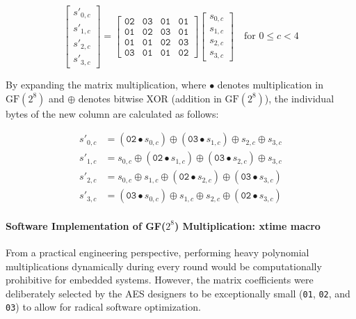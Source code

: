 \documentclass[11pt,a4paper]{report}
\begin{document}
\begin{equation}
\begin{bmatrix}
    s'_{0,c} \\
    s'_{1,c} \\
    s'_{2,c} \\
    s'_{3,c}
\end{bmatrix}
=
\begin{bmatrix}
    \texttt{02} & \texttt{03} & \texttt{01} & \texttt{01} \\
    \texttt{01} & \texttt{02} & \texttt{03} & \texttt{01} \\
    \texttt{01} & \texttt{01} & \texttt{02} & \texttt{03} \\
    \texttt{03} & \texttt{01} & \texttt{01} & \texttt{02}
\end{bmatrix}
\begin{bmatrix}
    s_{0,c} \\
    s_{1,c} \\
    s_{2,c} \\
    s_{3,c}
\end{bmatrix}
\quad \text{for } 0 \le c < 4
\label{eq:mix_columns_matrix}
\end{equation}

By expanding the matrix multiplication, where $\bullet$ denotes multiplication in $\mathrm{GF}(2^8)$ and $\oplus$ denotes bitwise XOR (addition in $\mathrm{GF}(2^8)$), the individual bytes of the new column are calculated as follows:

\begin{equation}
\begin{aligned}
    s'_{0,c} &= (\texttt{02} \bullet s_{0,c}) \oplus (\texttt{03} \bullet s_{1,c}) \oplus s_{2,c} \oplus s_{3,c} \\
    s'_{1,c} &= s_{0,c} \oplus (\texttt{02} \bullet s_{1,c}) \oplus (\texttt{03} \bullet s_{2,c}) \oplus s_{3,c} \\
    s'_{2,c} &= s_{0,c} \oplus s_{1,c} \oplus (\texttt{02} \bullet s_{2,c}) \oplus (\texttt{03} \bullet s_{3,c}) \\
    s'_{3,c} &= (\texttt{03} \bullet s_{0,c}) \oplus s_{1,c} \oplus s_{2,c} \oplus (\texttt{02} \bullet s_{3,c})
\end{aligned}
\label{eq:mix_columns_bytes}
\end{equation}

\paragraph{Software Implementation of GF($2^8$) Multiplication: xtime macro}
From a practical engineering perspective, performing heavy polynomial multiplications dynamically during every round would be computationally prohibitive for embedded systems. 
However, the matrix coefficients were deliberately selected by the AES designers to be exceptionally small (\texttt{01}, \texttt{02}, and \texttt{03}) to allow for radical software optimization. 
\end{document}
